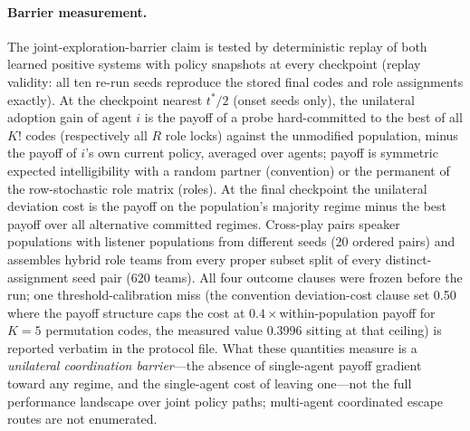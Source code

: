 \documentclass[11pt]{article}
\begin{document}
\paragraph{Barrier measurement.}
The joint-exploration-barrier claim is tested by deterministic replay
of both learned positive systems with policy snapshots at every
checkpoint (replay validity: all ten re-run seeds reproduce the stored
final codes and role assignments exactly). At the checkpoint nearest
$t^{*}/2$ (onset seeds only), the unilateral adoption gain of agent
$i$ is the payoff of a probe hard-committed to the best of all $K!$
codes (respectively all $R$ role locks) against the unmodified
population, minus the payoff of $i$'s own current policy, averaged
over agents; payoff is symmetric expected intelligibility with a
random partner (convention) or the permanent of the row-stochastic
role matrix (roles). At the final checkpoint the unilateral deviation
cost is the payoff on the population's majority regime minus the best
payoff over all alternative committed regimes. Cross-play pairs
speaker populations with listener populations from different seeds
(20 ordered pairs) and assembles hybrid role teams from every proper
subset split of every distinct-assignment seed pair (620 teams). All
four outcome clauses were frozen before the run; one
threshold-calibration miss (the convention deviation-cost clause set
0.50 where the payoff structure caps the cost at
$0.4\times$within-population payoff for $K{=}5$ permutation codes,
the measured value 0.3996 sitting at that ceiling) is reported
verbatim in the protocol file. What these quantities measure is a
\emph{unilateral coordination barrier}---the absence of single-agent
payoff gradient toward any regime, and the single-agent cost of
leaving one---not the full performance landscape over joint policy
paths; multi-agent coordinated escape routes are not enumerated.
\end{document}
